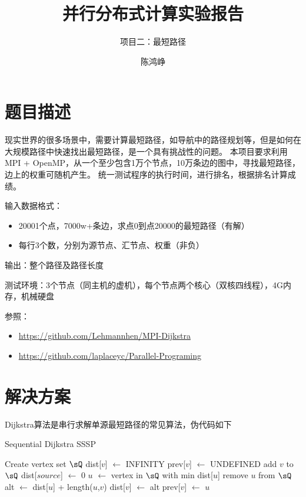 \documentclass[reportComp]{thesis}
\title{并行分布式计算实验报告}
\subtitle{项目二：最短路径}
\author{陈鸿峥}
\begin{document}
\maketitle

\section{题目描述}
现实世界的很多场景中，需要计算最短路径，如导航中的路径规划等，但是如何在大规模路径中快速找出最短路径，是一个具有挑战性的问题。
本项目要求利用MPI + OpenMP，从一个至少包含1万个节点，10万条边的图中，寻找最短路径，边上的权重可随机产生。
统一测试程序的执行时间，进行排名，根据排名计算成绩。

输入数据格式：
\begin{itemize}
	\item 20001个点，7000w+条边，求点0到点20000的最短路径（有解）
	\item 每行3个数，分别为源节点、汇节点、权重（非负）
\end{itemize}

输出：整个路径及路径长度

测试环境：3个节点（同主机的虚机），每个节点两个核心（双核四线程），4G内存，机械硬盘

参照：
\begin{itemize}
\item \url{https://github.com/Lehmannhen/MPI-Dijkstra}
\item \url{https://github.com/laplaceyc/Parallel-Programing}
\end{itemize}

\section{解决方案}
Dijkstra算法是串行求解单源最短路径的常见算法，伪代码如下
\begin{algorithm}[H]
\caption{Sequential Dijkstra SSSP}
\begin{algorithmic}[1]
\State Create vertex set $\sQ$
\State dist[$v$] $\gets$ INFINITY
\State prev[$v$] $\gets$ UNDEFINED
\State add $v$ to $\sQ$
\EndFor
\State dist[$source$] $\gets$ $0$
\State $u$ $\gets$ vertex in $\sQ$ with min dist[$u$]
\State remove $u$ from $\sQ$
\State alt $\gets$ dist[$u$] + length($u$,$v$)
\State dist[$v$] $\gets$ alt
\State prev[$v$] $\gets$ $u$
\EndIf
\EndFor
\EndWhile
\State{}
\EndProcedure
\end{algorithmic}
\end{algorithm}
\end{document}
